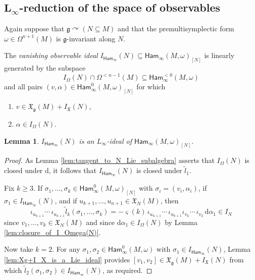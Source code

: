 \documentclass[10pt,a4paper]{amsart}
\numberwithin{equation}{section}
\newtheorem{Lemma}[Theorem]{Lemma}
\newcommand{\g}{\mathfrak{g}}
\newcommand{\Ham}{\mathsf{Ham}}
\newcommand{\fgmodule}{\mathfrak{X}_{\g}}
\newcommand{\tgtvanform}{I_{\Omega}(N)}
\newcommand{\vanvf}{I_{\mathfrak{X}}(N)}%
\newcommand{\X}{\mathfrak{X}}
\renewcommand{\subset}{\subseteq}
\renewcommand{\d}{\mathrm{d}}
\begin{document}
\subsection[L\_infty-reduction of the space of observables]{$\boldsymbol{L_\infty}$-reduction of the space of observables}%

Again suppose that $\g\curvearrowright(N\subset M)$ and that the premultisymplectic form $\omega\in\Omega^{n+1}(M)$ is $\g$-invariant along $N$.

\begin{Definition}\label{def:VanishIdeal}
	The \emph{vanishing observable ideal} $I_{\Ham_\infty}(N)\subset \Ham_\infty(M,\omega)_{[N]}$ is linearly generated by the subspace
	\[
		I_\Omega(N)\cap\Omega^{<n-1}(M) \subset \Ham_\infty^{<0}(M,\omega)
	\]
	and all pairs $(v,\alpha)\in\Ham_\infty^0(M,\omega)_{[N]}$ for which
	\begin{enumerate}\itemsep=0pt
		\item[(i)] $v\in \fgmodule(M) + \vanvf$,
		\item[(ii)] $\alpha\in I_\Omega(N)$.
	\end{enumerate}
\end{Definition}

\begin{Lemma}\label{lem:Ham_infty_is_an_L-infty_ideal}
	$I_{\Ham_\infty}(N)$ is an $L_\infty$-ideal of $\Ham_\infty(M,\omega)_{[N]}$.
\end{Lemma}

\begin{proof}
	As Lemma \ref{lem:tangent_to_N_Lie_subalgebra} asserts that $\tgtvanform$ is closed under $\d$, it follows that $I_{\Ham_\infty}(N)$ is closed under $\tilde{l}_1$.

	Fix $k\geq 3$. If $\sigma_1,\dots,\sigma_k\in \Ham_\infty^0(M,\omega)_{[N]}$ with $\sigma_i=(v_i,\alpha_i)$, if $\sigma_1\in I_{\Ham_\infty}(N)$, and if $u_{k+1},\dots,u_{n+1}\in\X_N(M)$, then
	\[
		\iota_{u_{n+1}}\!\cdots\,\iota_{u_{k+1}}\tilde{l}_k(\sigma_1,\dots,\sigma_k)
			= {-}\varsigma(k)\,\iota_{u_{n+1}}\!\cdots\,\iota_{u_{k+1}}\iota_{v_k}\!\cdots\,\iota_{v_2}\,\d\alpha_1 \in I_N
	\]
	since $v_1,\dots,v_k\in \X_N(M)$ and since $\d\alpha_1\in \tgtvanform$ by Lemma \ref{lem:closure_of_I_Omega(N)}.

	Now take $k=2$. For any $\sigma_1,\sigma_2\in \Ham_\infty^0(M,\omega)$ with $\sigma_1\in I_{\Ham_\infty}(N)$, Lemma \ref{lem:Xg+I_X_is_a_Lie_ideal} provides $[v_1,v_2]\in \X_\g(M) + I_\X(N)$ from which $\tilde{l}_2(\sigma_1,\sigma_2)\in I_{\Ham_\infty}(N)$, as required.
\end{proof}
\end{document}
